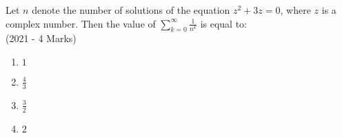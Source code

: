     \item{
        
            Let $n$ denote the number of solutions of the equation $z^2 + 3z = 0$, where $z$ is a complex number. Then the value of $\sum_{k=0}^{\infty} \frac{1}{n^k}$ is equal to:\\ \text{ }
             \hfill
              {(2021 - 4 Marks)}
			\begin{multicols}{4}              
	              	\begin{enumerate}
	              		\item $1$
	              		\item $\frac{4}{3}$
	              		\item $\frac{3}{2}$
	              		\item $2$
	              	\end{enumerate}
  			\end{multicols}      
        }



